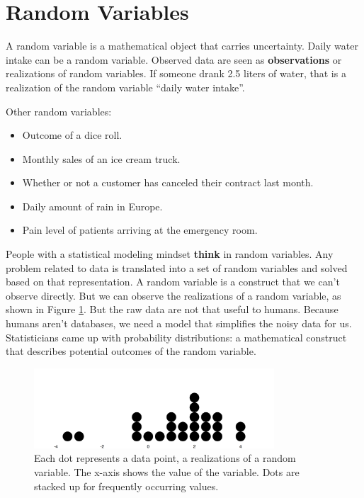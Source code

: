 \documentclass[
  10pt,
]{scrbook}
\providecommand{\tightlist}{%
  \setlength{\itemsep}{0pt}\setlength{\parskip}{0pt}}
\begin{document}
\hypertarget{random-variables}{%
\section{Random Variables}\label{random-variables}}

A random variable is a mathematical object that carries uncertainty.
Daily water intake can be a random variable.
Observed data are seen as \textbf{observations} or realizations of random variables.
If someone drank 2.5 liters of water, that is a realization of the random variable ``daily water intake''.

Other random variables:

\begin{itemize}
\tightlist
\item
  Outcome of a dice roll.
\item
  Monthly sales of an ice cream truck.
\item
  Whether or not a customer has canceled their contract last month.
\item
  Daily amount of rain in Europe.
\item
  Pain level of patients arriving at the emergency room.
\end{itemize}

People with a statistical modeling mindset \textbf{think} in random variables.
Any problem related to data is translated into a set of random variables and solved based on that representation.
A random variable is a construct that we can't observe directly.
But we can observe the realizations of a random variable, as shown in Figure \ref{fig:variable}.
But the raw data are not that useful to humans.
Because humans aren't databases, we need a model that simplifies the noisy data for us.
Statisticians came up with probability distributions: a mathematical construct that describes potential outcomes of the random variable.

\begin{figure}

{\centering \includegraphics[width=0.8\textwidth]{figures/variable-1} 

}

\caption{Each dot represents a data point, a realizations of a random variable. The x-axis shows the value of the variable. Dots are stacked up for frequently occurring values. }\label{fig:variable}
\end{figure}
\end{document}
